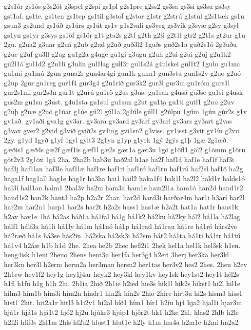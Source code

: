 {g2s1ór
gs1ós
g3s2ót
g3spel
g2spí
gs1pl
g2s1pre
g2ss2
gs3sa
gs3si
gs3su
gs3sy
gst1af.
gs1te.
gs1ten
gs1tep
gs1til
g3stof
g2stor
g1str
g2strú
g1stul
g2s1tæk
gs1u
gsun3
gs2und
gs1úð
gs1úrs
gs1út
gs1v
g1s2vali
gs3veg
gs3vík
g3svæ
g2sy
g3syl
gs1yn
gs1yr
g3sys
gs1öf
gs1ör
g1t
gta2s
g2tf
g2th
g2ti
g2t1l
gtr2
g2t1s
gt2ur
g1u
2gu.
g2ua2
g3uar
g2uá
g2ub
g2ud
g2uð
guð3l2
1guðs
guð2s1a
guð2s1ó
2g3uðu
g2ue
g2uf
gu3fl
g2ug
gu1g2a
g4uge
gu1gi
g3ugu
g2uh
g2ui
g2uí
g2uj
g2u1k2
gu2l1á
gul1d2
g2u1li
g3ulin
gul1lag
gull3r
gul1s2á
g4ulskei
gul1t2
1gulu
gu1ma
gu1mi
gu1mú
2gun
guna2r
gun4ar4gi
gun1k
gunn1
gun3stu
gun1s2v
g2uo
g2uó
g2up
2gur
gu1reg
gur1f4
gur3g4
g2u1rið
gur3k2
gur3l
gur3m
gu1róm
gurs1l
gur2s1mi
gur2s3n
gur1t
g2urú
gu1rö
g2us
g3us.
gu1sak
g4usá
gu3se
gu1si
g4usk
gus2m
gu1sn
g3ust.
g4u1sta
gu1sul
gu1sun
g2ut
gu1ta
gu1ti
gutl1
g2uu
g2uv
g2uþ
g2uæ
g2uö
g1úar
g1úe
gú2l
gúl1a
2g1úle
gúll1
g2úlpu
1gúm
1gún
gúr2s
g1v
gv1að.
gv1aði
gva1g
gv3ar.
gv3ara
gv3ard
gv3arf
gv3ari
gv3ars
gv3art
g2vas
g3vax
gver2
g2vid
g3við
gvið2s
gv1ing
gvi1sn2
g3viss.
gv1isst
g3vit
gv1ín
g2vu
2gy.
g1yd
1gyð
g1yf
1gyl
gylt3
2g1yn
g1yp
g1yrk
1gý
2gýs
g1þ
1gæ
2g1æð.
gæðis1
gæð4s
gæ2f
gæf1is
gæf1l
gæ2s
gæt1a
gæt3u
1gö
g1öfl1
göl2
g1ömm
g1öru
göt2v3
2g1öx
1gå
2ha.
2ha2b
hab3u
hað2al
h1ae
ha2f
haf1á
haf1e
haf1f
haf3i
haf3j
haf1lan
haf3le
haf1læ
haf1re
haf1ri
haf1ró
haf1ru
haf1rú
haf2sl
haf1ö
ha2g
haga1f
hag1all
hag1e
hag1r
ha3ha
hai1
hail2
haka1f4
hak1l
ha2l2
hald1r
halds1ó
hal3í
hall1an
halm1
2hal3v
ha2m
ham3a
ham1e
ham2l1a
ham1ó
han2d
hand1r2
hand1s2
han2k
hant3
ha2p
h2a2r
2har.
har2d
hard3i
harðar4m
har1i
h3arí
har2l
har2m
har2n1
harp1
har2s
har2t
h2a2s
hass1
has1æ
h2a2t
hat1a
hat1r
haus1k
h2av
hav1e
1há
há2as
háð1a
há1fal
há1g
há1k2
há2ku
há2ky
hál2
há1la
há2lag
hálf1
hálf3a
há1li
há1ly
há1m
há1nó
há1p
há1rad
há1rau
há1re
há1ró
hárs2ve
há2ræð
há1s
há3se
hás2in.
há2ska
há2sk3i
há2sm
hát2
há1ta
há1ti
há1tr
há1tú
há1v4
h2áæ
h1b
h1d
2he.
2hea
he2b
2hec
hefl2i1
2hek
hel1a
hel1k
hel3sk
h1en.
heng4isk
h1eni
2heno
2hens
hent3u
her1fa
her3g4
h2eri
3herj
her3ka
her3kl
her3ku
her3l
h2erm
herm2a
her3man
hersn2
her1tas
her3v2
hes2
2hes.
2heu
h2ev
2h1ew
hey1f2
hey1g
hey1j4ar
heyk2
hey3kl
hey1kv
hey1sk
hey1st2
hey1t
hél2s
h1fl
h1fu
h1g
h1h
2hi.
2h1ia
2hið
2h1ie
h2ied
hie3s
hik1l
hik2s
hikst1
hi2l
hil1e
hilm3
him1b
him3i
him2n
hindr1
hin2k
hin2s
2hio
2hire
hirt3u
hi2s
hism3
hiss1
hist1
2hit.
hit2a1r
hitl3
h1i2v1
hí2al
híð1
hím1
hír1
h2íu
hj4
hja2
hjal1i
hjar3m
hjá1r
hjá1s
hjá1t2
hjó2
hj2u
hjúkr3
hjúp1
hjör2t
hk1
h2ke
2hl.
hlas2
2hlb
h2le
h2l2i
hlíf3s
2hl1m
2hls
hl2u2
hlust1
hlut1e
h2ly
h1m
hm4a
h2m1e
h2mi
hn2a2
}

